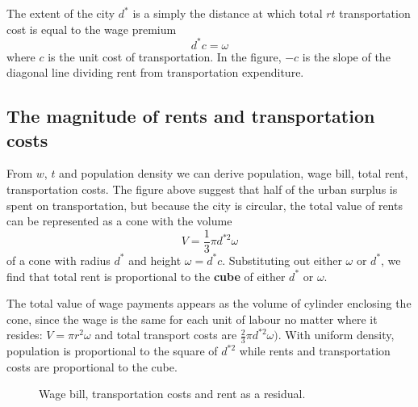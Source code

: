 The extent  of the city  $d^*$ is a simply the distance at which total $rt$ transportation cost  is equal to the wage premium
\[d^*{c}= \omega\]
where ${c}$ is the unit cost of transportation. In the figure, $-{c}$ is the slope of the diagonal line dividing rent from transportation expenditure.

 \subsection{The magnitude of rents and transportation costs}
 From $w$, $t$ and population density we can derive population, wage bill, total rent, transportation costs. The figure above suggest that  half of the urban surplus is spent on transportation, but because the city is circular, the total value of rents can be represented as  a cone with the volume  \[ V=\frac{1}{3}\pi  d^{*2} \omega \]
of a cone with radius $d^*$ and  height $\omega = d^*{c}$. Substituting out either  $\omega$ or  $d^*$, we find that total rent is  proportional to the \textbf{cube} of either  $d^*$ or $\omega$. 

The total value of wage payments appears as the volume of cylinder enclosing the cone, since the wage is the same for each unit of labour no matter where it resides: 
$V=\pi r^2 \omega$ 
and total transport costs are 
$\frac{2}{3}\pi  d^{*2} \omega).$
With uniform density, population is proportional to the square of  $d^{*2}$ while rents and  transportation costs are proportional to the cube. %



\begin{figure}
    \begin{center}
    
    \caption{Wage bill, transportation costs and rent as a residual.}
    \label{fig-city-conical}
    \end{center}
\end{figure}

